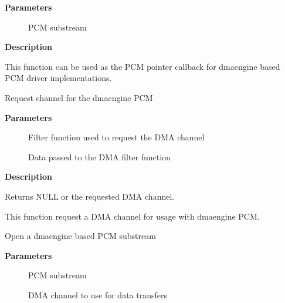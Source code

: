 \documentclass[a4paper,8pt,english]{sphinxmanual}
\begin{document}
\textbf{Parameters}
\begin{description}
\item[{}] \leavevmode
PCM substream

\end{description}

\textbf{Description}

This function can be used as the PCM pointer callback for dmaengine based PCM
driver implementations.

\begin{fulllineitems}
\label{sound/kernel-api/alsa-driver-api:c.snd_dmaengine_pcm_request_channel}
Request channel for the dmaengine PCM

\end{fulllineitems}


\textbf{Parameters}
\begin{description}
\item[{}] \leavevmode
Filter function used to request the DMA channel

\item[{}] \leavevmode
Data passed to the DMA filter function

\end{description}

\textbf{Description}

Returns NULL or the requested DMA channel.

This function request a DMA channel for usage with dmaengine PCM.

\begin{fulllineitems}
\label{sound/kernel-api/alsa-driver-api:c.snd_dmaengine_pcm_open}
Open a dmaengine based PCM substream

\end{fulllineitems}


\textbf{Parameters}
\begin{description}
\item[{}] \leavevmode
PCM substream

\item[{}] \leavevmode
DMA channel to use for data transfers

\end{description}
\end{document}
